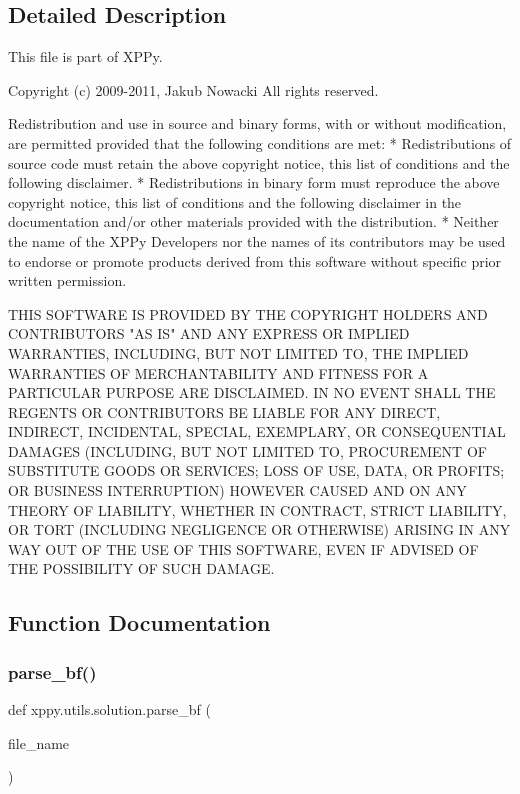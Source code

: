 \subsection{Detailed Description}
\begin{DoxyVerb}This file is part of XPPy.

Copyright (c) 2009-2011, Jakub Nowacki
All rights reserved.

Redistribution and use in source and binary forms, with or without
modification, are permitted provided that the following conditions are met:
    * Redistributions of source code must retain the above copyright
      notice, this list of conditions and the following disclaimer.
    * Redistributions in binary form must reproduce the above copyright
      notice, this list of conditions and the following disclaimer in the
      documentation and/or other materials provided with the distribution.
    * Neither the name of the XPPy Developers nor the
      names of its contributors may be used to endorse or promote products
      derived from this software without specific prior written permission.

THIS SOFTWARE IS PROVIDED BY THE COPYRIGHT HOLDERS AND CONTRIBUTORS "AS IS" AND
ANY EXPRESS OR IMPLIED WARRANTIES, INCLUDING, BUT NOT LIMITED TO, THE IMPLIED
WARRANTIES OF MERCHANTABILITY AND FITNESS FOR A PARTICULAR PURPOSE ARE
DISCLAIMED. IN NO EVENT SHALL THE REGENTS OR CONTRIBUTORS BE LIABLE FOR ANY
DIRECT, INDIRECT, INCIDENTAL, SPECIAL, EXEMPLARY, OR CONSEQUENTIAL DAMAGES
(INCLUDING, BUT NOT LIMITED TO, PROCUREMENT OF SUBSTITUTE GOODS OR SERVICES;
LOSS OF USE, DATA, OR PROFITS; OR BUSINESS INTERRUPTION) HOWEVER CAUSED AND
ON ANY THEORY OF LIABILITY, WHETHER IN CONTRACT, STRICT LIABILITY, OR TORT
(INCLUDING NEGLIGENCE OR OTHERWISE) ARISING IN ANY WAY OUT OF THE USE OF THIS
SOFTWARE, EVEN IF ADVISED OF THE POSSIBILITY OF SUCH DAMAGE.
\end{DoxyVerb}
 

\subsection{Function Documentation}
\mbox{\label{namespacexppy_1_1utils_1_1solution_a4af681798b29c0eb1db40f735f1175ca}} 
\subsubsection{\texorpdfstring{parse\+\_\+bf()}{parse\_bf()}}
{\footnotesize\ttfamily def xppy.\+utils.\+solution.\+parse\+\_\+bf (\begin{DoxyParamCaption}\item[{}]{file\+\_\+name }\end{DoxyParamCaption})}

